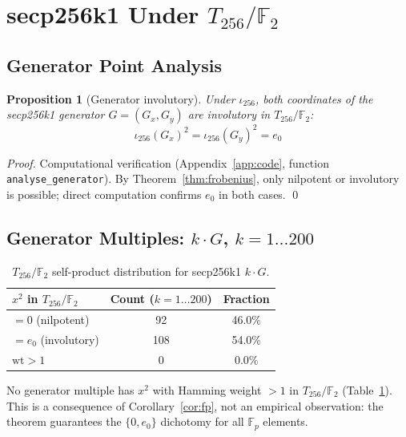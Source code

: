 \documentclass[runningheads]{llncs}
\theoremstyle{plain}
\newtheorem{proposition}[theorem]{Proposition}
\theoremstyle{definition}
\newcommand{\GFtwo}{\mathbb{F}_2}
\newcommand{\hw}{\mathrm{wt}}
\newcommand{\Fp}{\mathbb{F}_p}
\begin{document}
\section{secp256k1 Under $T_{256}/\GFtwo$}
\label{sec:secp256k1}

\subsection{Generator Point Analysis}

\begin{proposition}[Generator involutory]
\label{prop:ginvol}
Under $\iota_{256}$, both coordinates of the secp256k1 generator $G = (G_x, G_y)$
are involutory in $T_{256}/\GFtwo$:
\[
\iota_{256}(G_x)^2 = \iota_{256}(G_y)^2 = e_0
\]
\end{proposition}

\begin{proof}
Computational verification (Appendix~\ref{app:code}, function \texttt{analyse\_generator}).
By Theorem~\ref{thm:frobenius}, only nilpotent or involutory is possible;
direct computation confirms $e_0$ in both cases. \qed
\end{proof}

\subsection{Generator Multiples: $k \cdot G$, $k = 1 \ldots 200$}

\begin{table}[h]
\centering
\caption{$T_{256}/\GFtwo$ self-product distribution for secp256k1 $k \cdot G$.}
\label{tab:kG}
\begin{tabular}{lcc}
\toprule
$x^2$ in $T_{256}/\GFtwo$ & Count ($k=1\ldots 200$) & Fraction \\
\midrule
$= 0$ (nilpotent) & 92 & 46.0\% \\
$= e_0$ (involutory) & 108 & 54.0\% \\
$\hw > 1$ & 0 & 0.0\% \\
\bottomrule
\end{tabular}
\end{table}

No generator multiple has $x^2$ with Hamming weight $> 1$ in $T_{256}/\GFtwo$
(Table~\ref{tab:kG}). This is a consequence of Corollary~\ref{cor:fp}, not an
empirical observation: the theorem guarantees the $\{0, e_0\}$ dichotomy for
all $\Fp$ elements.
\end{document}
